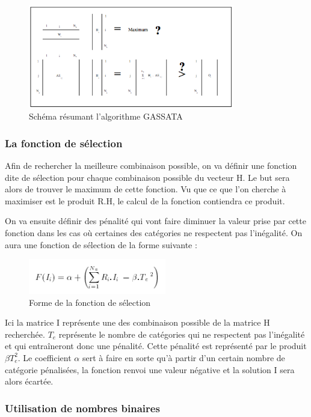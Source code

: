 \documentclass[a4paper, 11pt]{article}
\begin{document}
\begin{figure}[h!]
\center
\includegraphics[width=9cm]{images/algoSchema.png}
\caption{Schéma résumant l'algorithme GASSATA}
\end{figure}

\subsubsection{La fonction de sélection}

Afin de rechercher la meilleure combinaison possible, on va définir une fonction dite de sélection pour chaque combinaison possible du vecteur H. Le but sera alors de trouver le maximum de cette fonction. Vu que ce que l'on cherche à maximiser est le produit R.H, le calcul de la fonction contiendra ce produit. 

On va ensuite définir des pénalité qui vont faire diminuer la valeur prise par cette fonction dans les cas où certaines des catégories ne respectent pas l'inégalité. On aura une fonction de sélection de la forme suivante : \\

\begin{figure}[h!]
\center
\includegraphics[width=6cm]{images/fonctionSelection.png}
\caption{Forme de la fonction de sélection}
\end{figure}

Ici la matrice I représente une des combinaison possible de la matrice H recherchée. $T_e$ représente le nombre de catégories qui ne respectent pas l'inégalité et qui entraîneront donc une pénalité. Cette pénalité est représenté par le produit $\beta T_e^2$. Le coefficient $\alpha$ sert à faire en sorte qu'à partir d'un certain nombre de catégorie pénalisées, la fonction renvoi une valeur négative et la solution I sera alors écartée. 

\subsubsection{Utilisation de nombres binaires}
\end{document}
